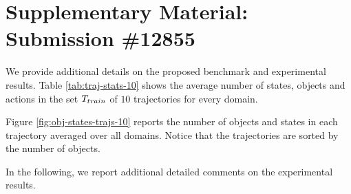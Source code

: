 \clearpage

\section*{Supplementary Material: Submission \#12855}

%
% 
%

We provide additional details on the proposed benchmark and experimental results. Table \ref{tab:traj-stats-10} shows the average number of states, objects and actions in the set $T_{train}$ of $10$ trajectories for every domain.
%

%

Figure \ref{fig:obj-states-trajs-10} reports the number of objects and states in each trajectory averaged over all domains. Notice that the trajectories are sorted by the number of objects. 



In the following, we report additional detailed comments on the experimental results.

